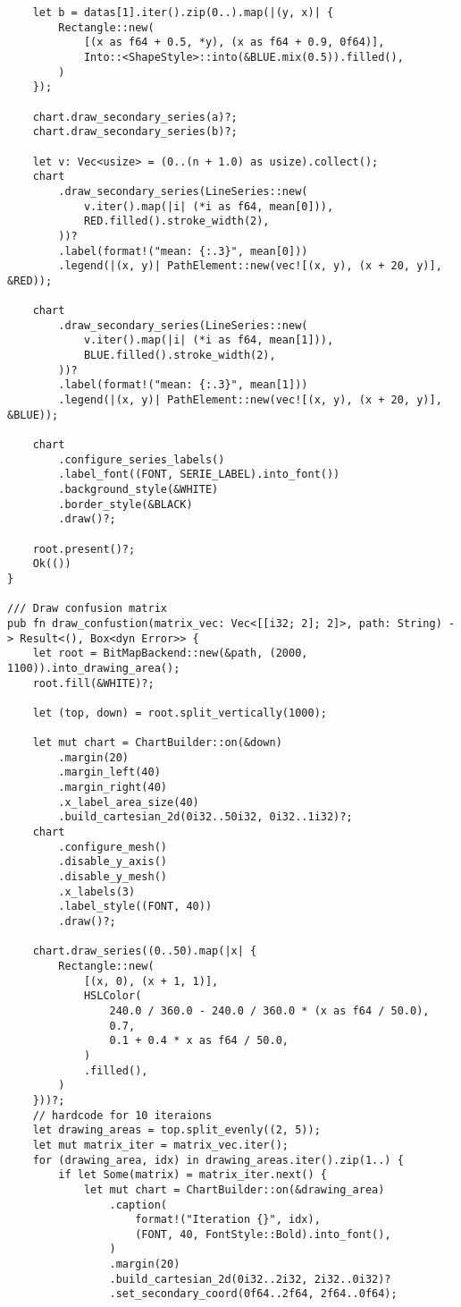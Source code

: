 \begin{code}
\begin{verbatim}
    let b = datas[1].iter().zip(0..).map(|(y, x)| {
        Rectangle::new(
            [(x as f64 + 0.5, *y), (x as f64 + 0.9, 0f64)],
            Into::<ShapeStyle>::into(&BLUE.mix(0.5)).filled(),
        )
    });

    chart.draw_secondary_series(a)?;
    chart.draw_secondary_series(b)?;

    let v: Vec<usize> = (0..(n + 1.0) as usize).collect();
    chart
        .draw_secondary_series(LineSeries::new(
            v.iter().map(|i| (*i as f64, mean[0])),
            RED.filled().stroke_width(2),
        ))?
        .label(format!("mean: {:.3}", mean[0]))
        .legend(|(x, y)| PathElement::new(vec![(x, y), (x + 20, y)], &RED));

    chart
        .draw_secondary_series(LineSeries::new(
            v.iter().map(|i| (*i as f64, mean[1])),
            BLUE.filled().stroke_width(2),
        ))?
        .label(format!("mean: {:.3}", mean[1]))
        .legend(|(x, y)| PathElement::new(vec![(x, y), (x + 20, y)], &BLUE));

    chart
        .configure_series_labels()
        .label_font((FONT, SERIE_LABEL).into_font())
        .background_style(&WHITE)
        .border_style(&BLACK)
        .draw()?;

    root.present()?;
    Ok(())
}

/// Draw confusion matrix
pub fn draw_confustion(matrix_vec: Vec<[[i32; 2]; 2]>, path: String) -> Result<(), Box<dyn Error>> {
    let root = BitMapBackend::new(&path, (2000, 1100)).into_drawing_area();
    root.fill(&WHITE)?;

    let (top, down) = root.split_vertically(1000);

    let mut chart = ChartBuilder::on(&down)
        .margin(20)
        .margin_left(40)
        .margin_right(40)
        .x_label_area_size(40)
        .build_cartesian_2d(0i32..50i32, 0i32..1i32)?;
    chart
        .configure_mesh()
        .disable_y_axis()
        .disable_y_mesh()
        .x_labels(3)
        .label_style((FONT, 40))
        .draw()?;

    chart.draw_series((0..50).map(|x| {
        Rectangle::new(
            [(x, 0), (x + 1, 1)],
            HSLColor(
                240.0 / 360.0 - 240.0 / 360.0 * (x as f64 / 50.0),
                0.7,
                0.1 + 0.4 * x as f64 / 50.0,
            )
            .filled(),
        )
    }))?;
    // hardcode for 10 iteraions
    let drawing_areas = top.split_evenly((2, 5));
    let mut matrix_iter = matrix_vec.iter();
    for (drawing_area, idx) in drawing_areas.iter().zip(1..) {
        if let Some(matrix) = matrix_iter.next() {
            let mut chart = ChartBuilder::on(&drawing_area)
                .caption(
                    format!("Iteration {}", idx),
                    (FONT, 40, FontStyle::Bold).into_font(),
                )
                .margin(20)
                .build_cartesian_2d(0i32..2i32, 2i32..0i32)?
                .set_secondary_coord(0f64..2f64, 2f64..0f64);


\end{verbatim}
\end{code}

